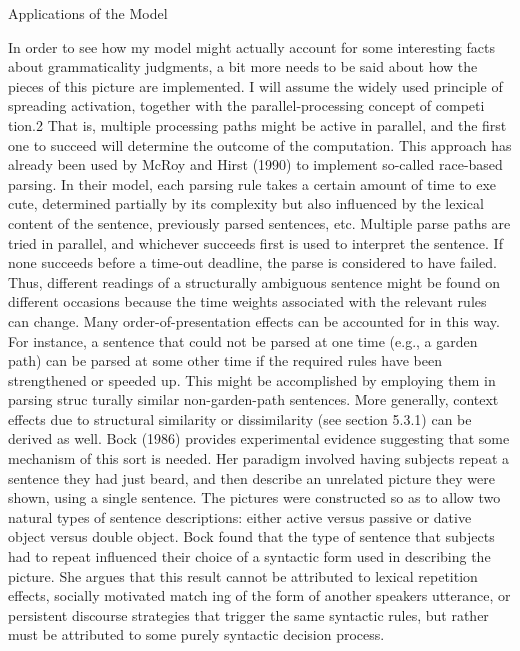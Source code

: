\clearpage\setcounter{page}{1}\begin{styleHeadingviii}
Applications of the Model
\end{styleHeadingviii}


\begin{styleTextbody}
In order to see how my model might actually account for some interesting facts about grammaticality judgments, a bit more needs to be said about how the pieces of this picture are implemented. I will assume the widely used principle of spreading activation, together with the parallel-processing concept of competi\- tion.2 That is, multiple processing paths might be active in parallel, and the first one to succeed will determine the outcome of the computation. This approach has already been used by McRoy and Hirst (1990) to implement so-called race-based parsing. In their model, each parsing rule takes a certain amount of time to exe\- cute, determined partially by its complexity but also influenced by the lexical content of the sentence, previously parsed sentences, etc. Multiple parse paths are tried in parallel, and whichever succeeds first is used to interpret the sentence. If none succeeds before a time-out deadline, the parse is considered to have failed. Thus, different readings of a structurally ambiguous sentence might be found on different occasions because the time weights associated with the relevant rules can change. Many order-of-presentation effects can be accounted for in this way. For instance, a sentence that could not be parsed at one time (e.g., a garden path) can be parsed at some other time if the required rules have been strengthened or speeded up. This might be accomplished by employing them in parsing struc\- turally similar non-garden-path sentences. More generally, context effects due to structural similarity or dissimilarity (see section 5.3.1) can be derived as well. Bock (1986) provides experimental evidence suggesting that some mechanism of this sort is needed. Her paradigm involved having subjects repeat a sentence they had just beard, and then describe an unrelated picture they{\textquotesingle} were shown, using a single sentence. The pictures were constructed so as to allow two natural types of sentence descriptions: either active versus passive or dative object versus double object. Bock found that the type of sentence that subjects had to repeat influenced their choice of a syntactic form used in describing the picture. She argues that this result cannot be attributed to lexical repetition effects, socially motivated match\- ing of the form of another speaker{\textquotesingle}s utterance, or persistent discourse strategies that trigger the same syntactic rules, but rather must be attributed to some purely syntactic decision process.
\end{styleTextbody}


